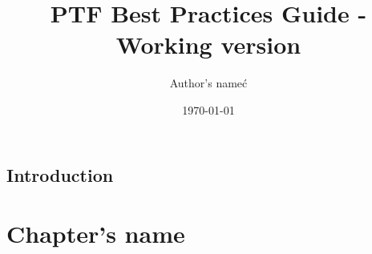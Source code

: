\documentclass[11pt,twoside,a4paper]{book}
\begin{document}
\title{\color{red}PTF Best Practices Guide - Working version}
\author{\color{blue}Author's name\'{c}}
\date{\color{green}\today}

\maketitle
\tableofcontents

\section*{Introduction}

\chapter{Chapter's name}
\end{document}
